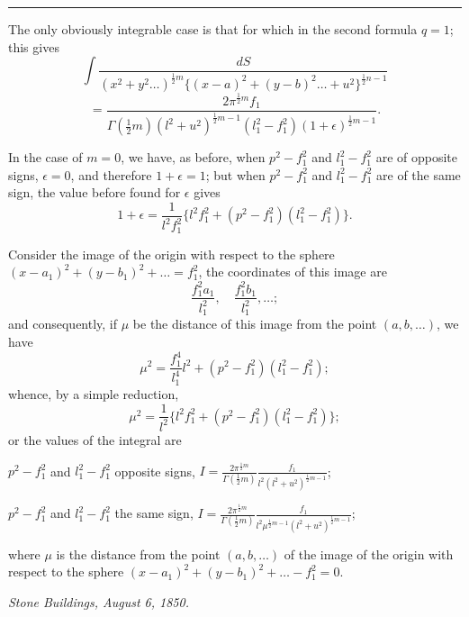 \documentclass[11pt,a4paper]{book}
\begin{document}
\vspace{0.5em}
\noindent\rule{\textwidth}{0.4pt}
\vspace{0.5em}

\noindent The only obviously integrable case is that for which in the second formula $q=1$; this gives
\[
\int \frac{dS}{(x^2+y^2\ldots)^{\frac{1}{2}m}\{(x-a)^2+(y-b)^2\ldots+u^2\}^{\frac{1}{2}n-1}}
\]
\[
= \frac{2\pi^{\frac{1}{2}m} f_1}{\Gamma(\frac{1}{2}m)(l^2+u^2)^{\frac{1}{2}m-1}(l_1^2-f_1^2)(1+\epsilon)^{\frac{1}{2}m-1}}.
\]

In the case of $m=0$, we have, as before, when $p^2-f_1^2$ and $l_1^2-f_1^2$ are of opposite signs, $\epsilon=0$, and therefore $1+\epsilon=1$; but when $p^2-f_1^2$ and $l_1^2-f_1^2$ are of the same sign, the value before found for $\epsilon$ gives
\[
1+\epsilon = \frac{1}{l^2 f_1^2} \{l^2 f_1^2 + (p^2-f_1^2)(l_1^2-f_1^2)\}.
\]

Consider the image of the origin with respect to the sphere $(x-a_1)^2 + (y-b_1)^2 + \ldots = f_1^2$, the coordinates of this image are
\[
\frac{f_1^2 a_1}{l_1^2}, \quad \frac{f_1^2 b_1}{l_1^2}, \ldots;
\]
and consequently, if $\mu$ be the distance of this image from the point $(a, b, \ldots)$, we have
\[
\mu^2 = \frac{f_1^4}{l_1^4} l^2 + (p^2-f_1^2)(l_1^2-f_1^2);
\]
whence, by a simple reduction,
\[
\mu^2 = \frac{1}{l^2}\{l^2 f_1^2 + (p^2-f_1^2)(l_1^2-f_1^2)\};
\]
or the values of the integral are

\begin{center}
$p^2-f_1^2$ and $l_1^2-f_1^2$ opposite signs, $\displaystyle I = \frac{2\pi^{\frac{1}{2}m}}{\Gamma(\frac{1}{2}m)} \frac{f_1}{l^2(l^2+u^2)^{\frac{1}{2}m-1}}$;
\end{center}
\begin{center}
$p^2-f_1^2$ and $l_1^2-f_1^2$ the same sign, $\displaystyle I = \frac{2\pi^{\frac{1}{2}m}}{\Gamma(\frac{1}{2}m)} \frac{f_1}{l^2 \mu^{\frac{1}{2}m-1}(l^2+u^2)^{\frac{1}{2}m-1}}$;
\end{center}

\vspace{0.3em}
\noindent where $\mu$ is the distance from the point $(a, b, \ldots)$ of the image of the origin with respect to the sphere $(x-a_1)^2 + (y-b_1)^2 + \ldots - f_1^2 = 0$.

\begin{flushright}
\textit{Stone Buildings, August 6, 1850.}
\end{flushright}

\newpage
\setcounter{page}{40}
\end{document}
